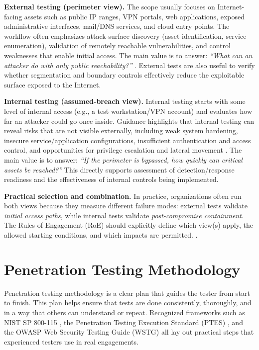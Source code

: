 \textbf{External testing (perimeter view).}
The scope usually focuses on Internet-facing assets such as public IP ranges, VPN portals, web applications, exposed administrative interfaces, mail/DNS services, and cloud entry points. The workflow often emphasizes attack-surface discovery (asset identification, service enumeration), validation of remotely reachable vulnerabilities, and control weaknesses that enable initial access. The main value is to answer: \emph{“What can an attacker do with only public reachability?”} \cite{gsaPentestGuide2024,hackeroneExternalNetworkPentest}. External tests are also useful to verify whether segmentation and boundary controls effectively reduce the exploitable surface exposed to the Internet.

\textbf{Internal testing (assumed-breach view).}
Internal testing starts with some level of internal access (e.g., a test workstation/VPN account) and evaluates how far an attacker could go once inside. Guidance highlights that internal testing can reveal risks that are not visible externally, including weak system hardening, insecure service/application configurations, insufficient authentication and access control, and opportunities for privilege escalation and lateral movement \cite{gsaPentestGuide2024}. The main value is to answer: \emph{“If the perimeter is bypassed, how quickly can critical assets be reached?”} This directly supports assessment of detection/response readiness and the effectiveness of internal controls being implemented.

\textbf{Practical selection and combination.}
In practice, organizations often run both views because they measure different failure modes: external tests validate \emph{initial access paths}, while internal tests validate \emph{post-compromise containment}. The Rules of Engagement (RoE) should explicitly define which view(s) apply, the allowed starting conditions, and which impacts are permitted. \cite{gsaPentestGuide2024,nistSP800115}.


\section{Penetration Testing Methodology}
\label{subsec:ch1-methodology}

Penetration testing methodology is a clear plan that guides the tester from start to finish. This plan helps ensure that tests are done consistently, thoroughly, and in a way that others can understand or repeat. Recognized frameworks such as NIST SP 800-115 \cite{nistSP800115}, the Penetration Testing Execution Standard (PTES) \cite{ptes}, and the OWASP Web Security Testing Guide (WSTG) \cite{owaspWSTG} all lay out practical steps that experienced testers use in real engagements.

